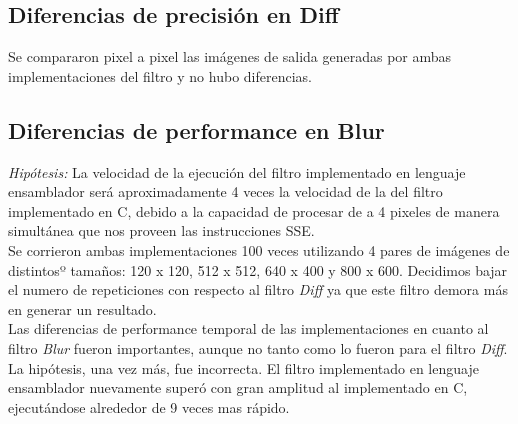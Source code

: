 \documentclass[10pt,a4paper,spanish]{article}
\begin{document}
\subsection{Diferencias de precisión en Diff}

Se compararon pixel a pixel las imágenes de salida generadas por ambas implementaciones del filtro y no hubo diferencias.

\subsection{Diferencias de performance en Blur}

\textit{Hipótesis:} La velocidad de la ejecución del filtro implementado en lenguaje ensamblador será aproximadamente 4 veces la velocidad de la del filtro implementado en C, debido a la capacidad de procesar de a 4 pixeles de manera simultánea que nos proveen las instrucciones SSE. \\

Se corrieron ambas implementaciones 100 veces utilizando 4 pares de imágenes de distintosº tamaños: 120 x 120, 512 x 512, 640 x 400 y 800 x 600. Decidimos bajar el numero de repeticiones con respecto al filtro \textit{Diff} ya que este filtro demora más en generar un resultado.\\

Las diferencias de performance temporal de las implementaciones en cuanto al filtro \textit{Blur} fueron importantes, aunque no tanto como lo fueron para el filtro \textit{Diff}. La hipótesis, una vez más, fue incorrecta. El filtro implementado en lenguaje ensamblador nuevamente superó con gran amplitud al implementado en C, ejecutándose alrededor de 9 veces mas rápido. \\

\begin{center}
\end{center}
\end{document}
